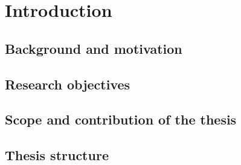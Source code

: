 
\chapter{Introduction}\label{chapter:introduction}

\section{Background and motivation}
\section{Research objectives}
\section{Scope and contribution of the thesis}
\section{Thesis structure}

